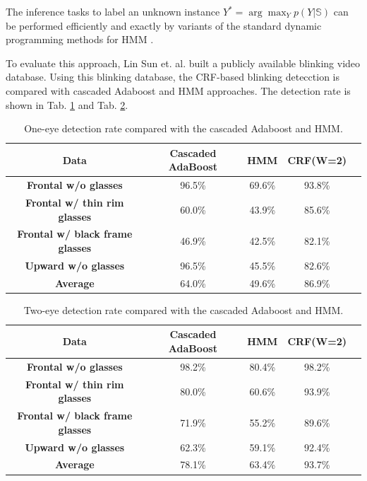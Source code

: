 \documentclass[journal]{IEEEtran}
\begin{document}
The inference tasks to label an unknown instance $Y^* = \arg \max_Y p(Y|\mathbb{S})$ can be performed efficiently and exactly by variants of the standard dynamic programming methods for HMM \cite{rabiner1989tutorial}.

To evaluate this approach, Lin Sun et. al. \cite{pan2007eyeblink} built a publicly available blinking video database. Using this blinking database, the CRF-based blinking detecction is compared with cascaded Adaboost and HMM approaches. The detection rate is shown in Tab. \ref{tab_D_1} and Tab. \ref{tab_D_2}.

\begin{table}[!htbp]
\centering
\caption{One-eye detection rate compared with the cascaded Adaboost and HMM.}
\label{tab_D_1}
\begin{tabular}{ccccc}
\toprule
\textbf{Data} & Cascaded AdaBoost & HMM &  CRF(W=2) \\
\midrule
\textbf{Frontal w/o glasses} & 96.5\% & 69.6\% & 93.8\% \\
\textbf{Frontal w/ thin rim glasses} & 60.0\% & 43.9\% & 85.6\% \\
\textbf{Frontal w/ black frame glasses} & 46.9\% & 42.5\% & 82.1\% \\
\textbf{Upward w/o glasses} & 96.5\% & 45.5\% & 82.6\% \\
\midrule
\textbf{Average} & 64.0\% & 49.6\% & 86.9\% \\
\bottomrule
\end{tabular}
\end{table}

\begin{table}[!htbp]
\centering
\caption{Two-eye detection rate compared with the cascaded Adaboost and HMM.}
\label{tab_D_2}
\begin{tabular}{ccccc}
\toprule
\textbf{Data} & Cascaded AdaBoost & HMM &  CRF(W=2) \\
\midrule
\textbf{Frontal w/o glasses} & 98.2\% & 80.4\% & 98.2\% \\
\textbf{Frontal w/ thin rim glasses} & 80.0\% & 60.6\% & 93.9\% \\
\textbf{Frontal w/ black frame glasses} & 71.9\% & 55.2\% & 89.6\% \\
\textbf{Upward w/o glasses} & 62.3\% & 59.1\% & 92.4\% \\
\midrule
\textbf{Average} & 78.1\% & 63.4\% & 93.7\% \\
\bottomrule
\end{tabular}
\end{table}
\end{document}
